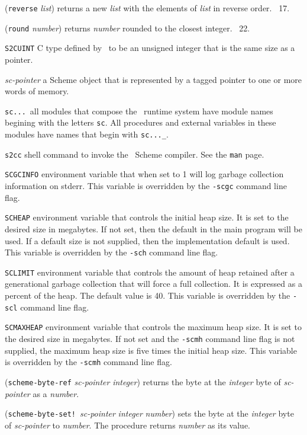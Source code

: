\documentclass[10pt,twocolumn]{article}
\begin{document}
(\texttt{reverse} \emph{list}) returns a new \emph{list} with the
elements of \emph{list} in reverse order.  \RRRRRS~17.

(\texttt{round} \emph{number}) returns \emph{number} rounded to the
closest integer.  \RRRRRS~22.

\texttt{S2CUINT} C type defined by \StoC\ to be an unsigned integer
that is the same size as a pointer.

\emph{sc-pointer} a Scheme object that is represented by a tagged
pointer to one or more words of memory.

\texttt{sc...}\ all modules that compose the \StoC\ runtime system
have module names begining with the letters \texttt{sc}.  All
procedures and external variables in these modules have names that
begin with \texttt{sc...\_}.

\texttt{s2cc} shell command to invoke the \StoC\ Scheme compiler.  See
the \texttt{man} page.

\texttt{SCGCINFO} environment variable that when set to 1 will log
garbage collection information on stderr.  This variable is overridden
by the \texttt{-scgc} command line flag.

\texttt{SCHEAP} environment variable that controls the initial heap
size.  It is set to the desired size in megabytes.  If not set, then
the default in the main program will be used.  If a default size is
not supplied, then the implementation default is used.  This variable
is overridden by the \texttt{-sch} command line flag.

\texttt{SCLIMIT} environment variable that controls the amount of heap
retained after a generational garbage collection that will force a
full collection.  It is expressed as a percent of the heap.  The
default value is 40.  This variable is overridden by the \texttt{-scl}
command line flag.

\texttt{SCMAXHEAP} environment variable that controls the maximum heap
size.  It is set to the desired size in megabytes.  If not set and the
\texttt{-scmh} command line flag is not supplied, the maximum heap
size is five times the initial heap size. This variable is overridden
by the \texttt{-scmh} command line flag.

(\texttt{scheme-byte-ref} \emph{sc-pointer} \emph{integer}) returns
the byte at the \emph{integer} byte of \emph{sc-pointer} as a
\emph{number}.

(\texttt{scheme-byte-set!}\ \emph{sc-pointer} \emph{integer}
\emph{number}) sets the byte at the \emph{integer} byte of
\emph{sc-pointer} to \emph{number}.  The procedure returns
\emph{number} as its value.
\end{document}

